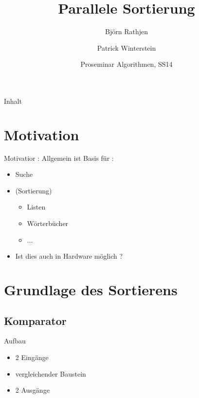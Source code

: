 \documentclass[ucs,9pt]{beamer}
\title[|| Sort] %
{Parallele Sortierung}
\author[] %
{Björn Rathjen \and Patrick Winterstein}
\institute[FU Berlin] %
{Freie Universität Berlin}
\date[ProSem Algo]
{Proseminar Algorithmen, SS14}
\begin{document}
\begin{frame}[plain]
  \titlepage
\end{frame}
 
\begin{frame}{Inhalt}
\end{frame}

\section{Motivation}
    
\begin{frame}{Motivatior : Allgemein}
    ist Basis für :
    \begin{itemize}
        \item Suche
        \item (Sortierung)
        \begin{itemize}
            \item Listen
            \item Wörterbücher
            \item ... 
        \end{itemize}
        \item Ist dies auch in Hardware möglich ?
    \end{itemize}
\end{frame}

\section{Grundlage des Sortierens}
\subsection{Komparator}
\begin{frame}{Aufbau}
    \begin{minipage}[c]{5cm}
        \begin{itemize}
            \item 2 Eingänge
            \item vergleichender Baustein
            \item 2 Ausgänge
        \end{itemize}
    \end{minipage}
\end{frame}
\end{document}
